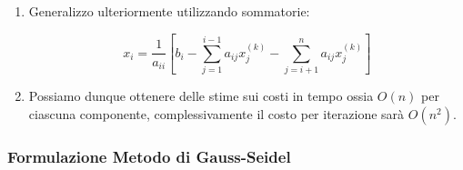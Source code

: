 \documentclass{article}
\begin{document}
\begin{enumerate}
        \newpage

        \item Generalizzo ulteriormente utilizzando sommatorie:
        
        \[ x_{i} = \frac{1}{a_{ii}} \left[ b_{i} - \sum_{j=1}^{i-1} a_{ij}x^{(k)}_{j} - \sum_{j=i+1}^{n} a_{ij}x^{(k)}_{j} \right] \]
        \vspace*{3px}
        \item Possiamo dunque ottenere delle stime sui costi in tempo ossia $O(n)$ per ciascuna componente, complessivamente il costo per iterazione sarà $O(n^{2})$.
    \end{enumerate}

\subsubsection{Formulazione Metodo di Gauss-Seidel}
\end{document}
